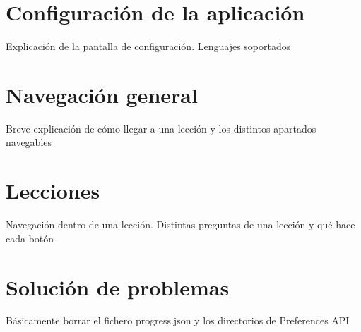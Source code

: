 \documentclass[]{article}
\begin{document}
\section{Configuración de la aplicación}
Explicación de la pantalla de configuración. Lenguajes soportados

\section{Navegación general}
Breve explicación de cómo llegar a una lección y los distintos apartados navegables

\section{Lecciones}
Navegación dentro de una lección. Distintas preguntas de una lección y qué hace cada botón

\section{Solución de problemas}
Básicamente borrar el fichero progress.json y los directorios de Preferences API
\end{document}
